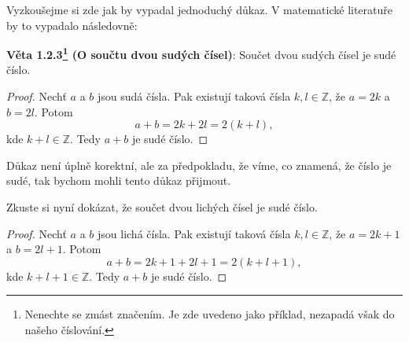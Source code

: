 \begin{example}
  Vyzkoušejme si zde jak by vypadal jednoduchý důkaz. V matematické literatuře by to vypadalo následovně:

  \vspace{0.3cm}

  \noindent\textbf{Věta 1.2.3\footnote{Nenechte se zmást značením. Je zde uvedeno jako příklad, nezapadá však do našeho číslování.} (O součtu dvou sudých čísel)}: Součet dvou sudých čísel je sudé číslo.

  \begin{proof}
    Nechť $a$ a $b$ jsou sudá čísla. Pak existují taková čísla $k, l \in \mathbb{Z}$, že $a = 2k$ a $b = 2l$. Potom
    \begin{equation}
      a + b = 2k + 2l = 2(k + l),
    \end{equation}
    kde $k + l \in \mathbb{Z}$. Tedy $a + b$ je sudé číslo.
  \end{proof}
  
  Důkaz není úplně korektní, ale za předpokladu, že víme, co znamená, že číslo je sudé, tak bychom mohli tento důkaz přijmout.
\end{example}

\begin{problem}
  Zkuste si nyní dokázat, že součet dvou lichých čísel je sudé číslo.
\end{problem}

\begin{solution}

  \begin{proof}
    Nechť $a$ a $b$ jsou lichá čísla. Pak existují taková čísla $k, l \in \mathbb{Z}$, že $a = 2k + 1$ a $b = 2l + 1$. Potom
    \begin{equation}
      a + b = 2k + 1 + 2l + 1 = 2(k + l + 1),
    \end{equation}
    kde $k + l + 1 \in \mathbb{Z}$. Tedy $a + b$ je sudé číslo.
  \end{proof}
\end{solution}
